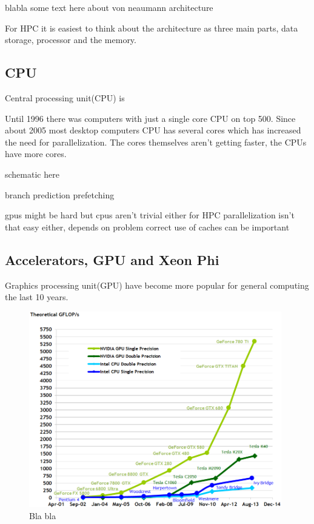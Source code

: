 \documentclass[10pt,a4paper]{report}
\begin{document}
blabla some text here about von neaumann architecture

For HPC it is easiest to think about the architecture as three main parts, data storage, processor and the memory.\cite{intro_hpc}

\subsection{CPU}
Central processing unit(CPU) is \cite{introduction_hpc_hager}

Until 1996 there was computers with just a single core CPU on top 500\cite{TOP500}. Since about 2005 most desktop computers CPU has several cores which has increased the need for parallelization. The cores themselves aren't getting faster, the CPUs have more cores.

schematic here

branch prediction
prefetching

gpus might be hard but cpus aren't trivial either for HPC
parallelization isn't that easy either, depends on problem
correct use of caches can be important\cite{drepper2007cpumemory}

\subsection{Accelerators, GPU and Xeon Phi}
Graphics processing unit(GPU) have become more popular for general computing the last 10 years.

\begin{figure}[h]
    \centering
    \includegraphics[width=11cm]{floating-point-operations-per-second.png}
    \caption{Bla bla \cite{cuda}}
    \label{fig:gpu_vs_cpu}
\end{figure}
\end{document}
